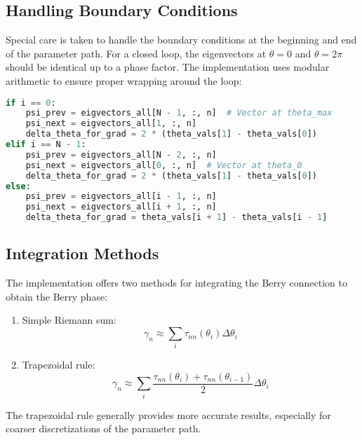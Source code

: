 \documentclass{article}
\begin{document}
\subsection{Handling Boundary Conditions}

Special care is taken to handle the boundary conditions at the beginning and end of the parameter path. For a closed loop, the eigenvectors at $\theta = 0$ and $\theta = 2\pi$ should be identical up to a phase factor. The implementation uses modular arithmetic to ensure proper wrapping around the loop:

\begin{lstlisting}[language=Python, caption=Handling boundary conditions in tau matrix calculation]
if i == 0:
    psi_prev = eigvectors_all[N - 1, :, n]  # Vector at theta_max
    psi_next = eigvectors_all[1, :, n]
    delta_theta_for_grad = 2 * (theta_vals[1] - theta_vals[0])
elif i == N - 1:
    psi_prev = eigvectors_all[N - 2, :, n]
    psi_next = eigvectors_all[0, :, n]  # Vector at theta_0
    delta_theta_for_grad = 2 * (theta_vals[1] - theta_vals[0])
else:
    psi_prev = eigvectors_all[i - 1, :, n]
    psi_next = eigvectors_all[i + 1, :, n]
    delta_theta_for_grad = theta_vals[i + 1] - theta_vals[i - 1]
\end{lstlisting}

\subsection{Integration Methods}

The implementation offers two methods for integrating the Berry connection to obtain the Berry phase:

\begin{enumerate}
    \item Simple Riemann sum:
    \begin{equation}
    \gamma_n \approx \sum_i \tau_{nn}(\theta_i) \Delta\theta_i
    \end{equation}
    
    \item Trapezoidal rule:
    \begin{equation}
    \gamma_n \approx \sum_i \frac{\tau_{nn}(\theta_i) + \tau_{nn}(\theta_{i-1})}{2} \Delta\theta_i
    \end{equation}
\end{enumerate}

The trapezoidal rule generally provides more accurate results, especially for coarser discretizations of the parameter path.
\end{document}
